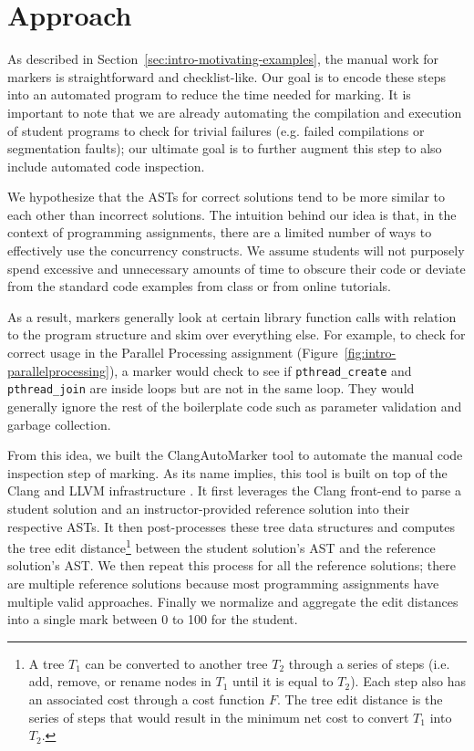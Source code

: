\section{Approach}

As described in Section~\ref{sec:intro-motivating-examples}, the manual work for markers is straightforward and checklist-like. Our goal is to encode these steps into an automated program to reduce the time needed for marking. It is important to note that we are already automating the compilation and execution of student programs to check for trivial failures (e.g. failed compilations or segmentation faults); our ultimate goal is to further augment this step to also include automated code inspection.

We hypothesize that the ASTs for correct solutions tend to be more similar to each other than incorrect solutions. The intuition behind our idea is that, in the context of programming assignments, there are a limited number of ways to effectively use the concurrency constructs. We assume students will not purposely spend excessive and unnecessary amounts of time to obscure their code or deviate from the standard code examples from class or from online tutorials.

As a result, markers generally look at certain library function calls with relation to the program structure and skim over everything else. For example, to check for correct usage in the Parallel Processing assignment (Figure~\ref{fig:intro-parallelprocessing}), a marker would check to see if \texttt{pthread\_create} and \texttt{pthread\_join} are inside loops but are not in the same loop. They would generally ignore the rest of the boilerplate code such as parameter validation and garbage collection.

From this idea, we built the ClangAutoMarker tool to automate the manual code inspection step of marking. As its name implies, this tool is built on top of the Clang and LLVM infrastructure \cite{lib-llvm}. It first leverages the Clang front-end to parse a student solution and an instructor-provided reference solution into their respective ASTs. It then post-processes these tree data structures and computes the tree edit distance\footnote{A tree $T_1$ can be converted to another tree $T_2$ through a series of steps (i.e. add, remove, or rename nodes in $T_1$ until it is equal to $T_2$). Each step also has an associated cost through a cost function $F$. The tree edit distance is the series of steps that would result in the minimum net cost to convert $T_1$ into $T_2$.} between the student solution's AST and the reference solution's AST. We then repeat this process for all the reference solutions; there are multiple reference solutions because most programming assignments have multiple valid approaches. Finally we normalize and aggregate the edit distances into a single mark between 0 to 100 for the student.

